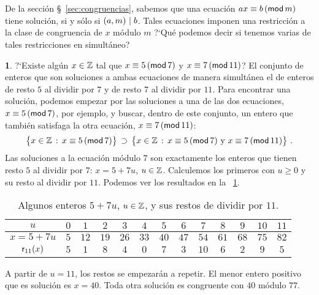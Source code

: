 \theoremstyle{plain}
\newtheorem{teoChino}{\teoname}[section]
\newtheorem{coroChino}[teoChino]{\coroname}

\theoremstyle{definition}
\newtheorem{obsChino}[teoChino]{\obsname}
\newtheorem{ejemChino}[teoChino]{\ejemname}


De la secci\'on \S~\ref{sec:congruencias}, sabemos que una ecuaci\'on
$ax\equiv b\tmodulo[m]$ tiene soluci\'on, si y s\'olo si
$\mcd{a,m}\mid b$. Tales ecuaciones imponen una restricci\'on a la clase
de congruencia de $x$ m\'odulo $m$ ?`Qu\'e podemos decir si tenemos varias
de tales restricciones en simult\'aneo?

\begin{ejemChino}\label{ejem:chino:setenta-y-siete}
	?`Existe alg\'un $x\in\Enteros$ tal que
	$x\equiv 5\tmodulo[7]$ y $x\equiv 7\tmodulo[11]$?
	El conjunto de enteros que son soluciones a ambas ecuaciones
	de manera simult\'anea el de enteros de resto $5$ al dividir por
	$7$ y de resto $7$ al dividir por $11$.
	Para encontrar una soluci\'on, podemos empezar por las
	soluciones a una de las dos ecuaciones, $x\equiv 5\tmodulo[7]$,
	por ejemplo, y buscar, dentro de este conjunto, un entero
	que tambi\'en satisfaga la otra ecuaci\'on, $x\equiv 7\tmodulo[11]$:
	\begin{displaymath}
		\big\{x\in\Enteros\,:\,x\equiv 5\tmodulo[7]\big\}
			\,\supset\,
			\big\{x\in\Enteros\,:\,
				x\equiv 5\tmodulo[7]\text{ y }
				x\equiv 7\tmodulo[11]\big\}
		\dispstop
	\end{displaymath}
	Las soluciones a la ecuaci\'on m\'odulo $7$ son exactamente
	los enteros que tienen resto $5$ al dividir por $7$:
	$x=5+7u$, $u\in\Enteros$. Calculemos los primeros con $u\geq 0$
	y su resto al dividir por $11$. Podemos ver los resultados
	en la \tablename~\ref{tab:ejem:chino:setenta-y-siete}.
	\begin{table}
		\centering
		\begin{tabular}{c|cccccccccccc}
			$u$ & $0$ & $1$ & $2$ & $3$ & $4$ & $5$
				& $6$ & $7$ & $8$ & $9$ & $10$ & $11$ \\
			\hline
			$x=5+7u$ & $5$ & $12$ & $19$ & $26$ & $33$ & $40$
				& $47$ & $54$ & $61$ & $68$ & $75$ & $82$ \\
			\hline
			$\resto[11](x)$ & $5$ & $1$ & $8$ & $4$ & $0$ & $7$
				& $3$ & $10$ & $6$ & $2$ & $9$ & $5$
		\end{tabular}
		\caption{
			Algunos enteros $5+7u$, $u\in\Enteros$, y sus
			restos de dividir por $11$.
		}\label{tab:ejem:chino:setenta-y-siete}
	\end{table}
	A partir de $u=11$, los restos se empezar\'an a repetir.
	El menor entero positivo que es soluci\'on es $x=40$.
	Toda otra soluci\'on es congruente con $40$ m\'odulo $77$.
\end{ejemChino}


